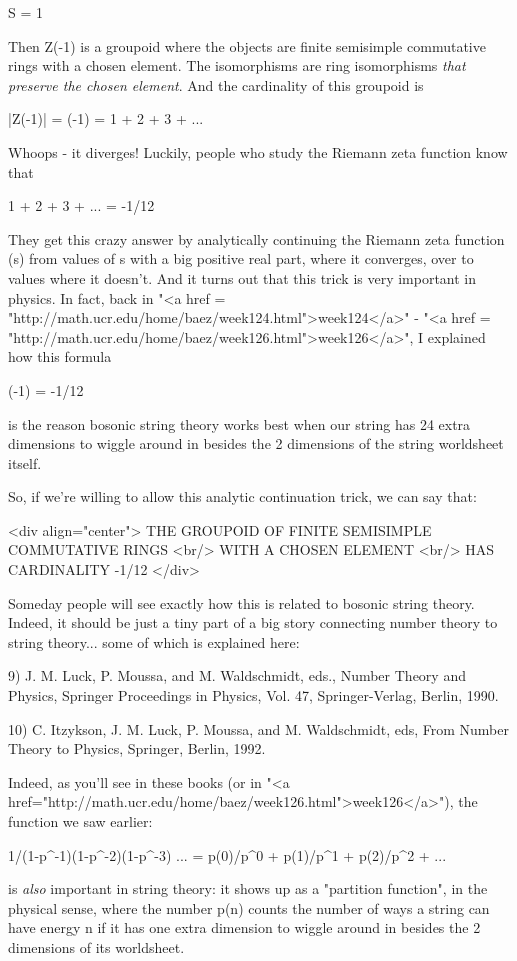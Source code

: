 S = 1

Then Z(-1) is a groupoid where the objects are finite semisimple
commutative rings with a chosen element.  The isomorphisms are ring
isomorphisms \emph{that preserve the chosen element}.  And the
cardinality of this groupoid is

|Z(-1)| = \zeta (-1)  = 1 + 2 + 3 + ...

Whoops - it diverges!  Luckily, people who study the Riemann zeta
function know that

1 + 2 + 3 + ... = -1/12

They get this crazy answer by analytically continuing the Riemann zeta
function \zeta (s) from values of s with a big positive real part,
where it converges, over to values where it doesn't.  And it turns out
that this trick is very important in physics.  In fact, back in
"<a href =
"http://math.ucr.edu/home/baez/week124.html">week124</a>" - "<a
href = "http://math.ucr.edu/home/baez/week126.html">week126</a>", I
explained how this formula

\zeta (-1) = -1/12

is the reason bosonic string theory works best when our string has 24
extra dimensions to wiggle around in besides the 2 dimensions of the
string worldsheet itself.

So, if we're willing to allow this analytic continuation trick, we can
say that:

<div align="center">
THE GROUPOID OF FINITE SEMISIMPLE COMMUTATIVE RINGS <br/>
WITH A CHOSEN ELEMENT <br/>
HAS CARDINALITY -1/12 
</div>

Someday people will see exactly how this is related to bosonic string
theory.  Indeed, it should be just a tiny part of a big story
connecting number theory to string theory... some of which is
explained here:

9) J. M. Luck, P. Moussa, and M. Waldschmidt, eds., Number Theory and Physics, Springer Proceedings in Physics, Vol. 47, Springer-Verlag, Berlin, 1990.

10) C. Itzykson, J. M. Luck, P. Moussa, and M. Waldschmidt, eds, From Number Theory to Physics, Springer, Berlin, 1992.

Indeed, as you'll see in these books (or in "<a href="http://math.ucr.edu/home/baez/week126.html">week126</a>"), the function we saw earlier:

1/(1-p^{-1})(1-p^{-2})(1-p^{-3}) ... =
p(0)/p^{0} + p(1)/p^{1} + p(2)/p^{2} + ...

is \emph{also} important in string theory: it shows up as a "partition
function", in the physical sense, where the number p(n) counts the
number of ways a string can have energy n if it has one extra
dimension to wiggle around in besides the 2 dimensions of its
worldsheet.

